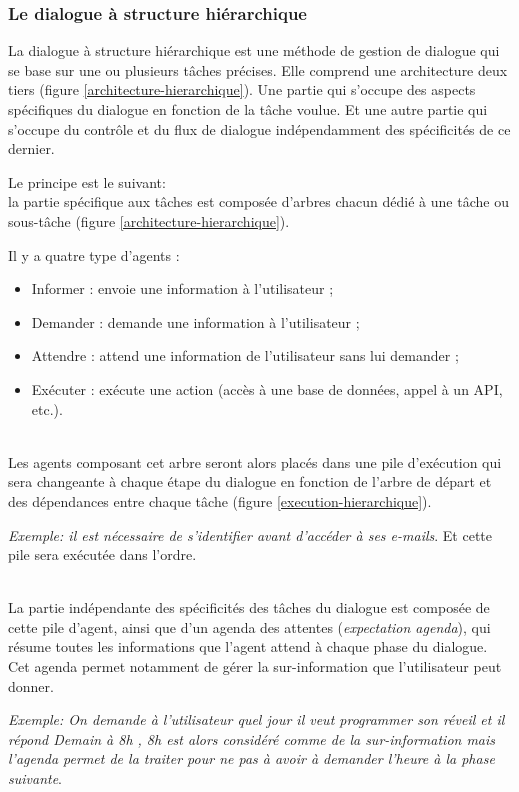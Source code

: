\subsubsection{Le dialogue à structure hiérarchique}
La dialogue à structure hiérarchique est une méthode de gestion de dialogue qui se base sur une ou plusieurs tâches précises. Elle comprend une architecture deux tiers (figure \ref{architecture-hierarchique}). Une partie qui s'occupe des aspects spécifiques du dialogue en fonction de la tâche voulue. Et une autre partie qui s'occupe du contrôle et du flux de dialogue indépendamment des spécificités de ce dernier. 

Le principe est le suivant: \\
la partie spécifique aux tâches est composée d'arbres chacun dédié à une tâche ou sous-tâche (figure \ref{architecture-hierarchique}). 

Il y a quatre type d'agents :
\begin{itemize}
	\item Informer : envoie une information à l'utilisateur ;
	\item Demander : demande une information à l'utilisateur ;
	\item Attendre : attend une information de l'utilisateur sans lui demander ;
	\item Exécuter : exécute une action (accès à une base de données, appel à un API, etc.). 
\end{itemize} 

~\\\indent
Les agents composant cet arbre seront alors placés dans une pile d'exécution qui sera changeante à chaque étape du dialogue en fonction de l'arbre de départ et des dépendances entre chaque tâche (figure \ref{execution-hierarchique}). 

\textit{Exemple: il est nécessaire de s'identifier avant d'accéder à ses e-mails}. Et cette pile sera exécutée dans l'ordre.

~\\\indent
La partie indépendante des spécificités des tâches du dialogue est composée de cette pile d'agent, ainsi que d'un agenda des attentes (\textit{expectation agenda}), qui résume toutes les informations que l'agent attend à chaque phase du dialogue. Cet agenda permet notamment de gérer la sur-information que l'utilisateur peut donner. 

\textit{Exemple: On demande à l'utilisateur quel jour il veut programmer son réveil et il répond \og Demain à 8h \fg, 8h est alors considéré comme de la sur-information mais l'agenda permet de la traiter pour ne pas à avoir à demander l'heure à la phase suivante}.



